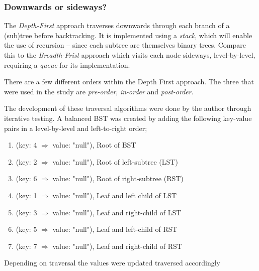 \documentclass[a4paper, 11pt]{article}
\begin{document}
    \subsubsection*{Downwards or sideways?}

    The \emph{Depth-First} approach traverses downwards through each branch of a (sub)tree
    before backtracking. It is implemented using a \emph{stack}, which will enable 
    the use of recursion -- since each subtree are themselves binary trees. Compare
    this to the \emph{Breadth-Frist} approach which visits each node sideways,
    level-by-level, requiring a \emph{queue} for its implementation.
    
    There are a few different orders within the Depth First approach. 
    The three that were used in the study are 
    \emph{pre-order}, \emph{in-order} and \emph{post-order}. 

    The development of these traversal algorithms were done by the author
    through iterative testing. 
    A balanced BST was created by adding the following key-value pairs in 
    a level-by-level and left-to-right order;
    \begin{enumerate}[label=(\roman*), itemsep=0pt]
        \item (key: 4 $\Rightarrow$ value: "null"), Root of BST
        \item (key: 2 $\Rightarrow$ value: "null"), Root of left-subtree (LST)
        \item (key: 6 $\Rightarrow$ value: "null"), Root of right-subtree (RST)
        \item (key: 1 $\Rightarrow$ value: "null"), Leaf and left child of LST
        \item (key: 3 $\Rightarrow$ value: "null"), Leaf and right-child of LST
        \item (key: 5 $\Rightarrow$ value: "null"), Leaf and left-child of RST
        \item (key: 7 $\Rightarrow$ value: "null"), Leaf and right-child of RST
    \end{enumerate}

    Depending on traversal the values were updated traversed accordingly
\end{document}
